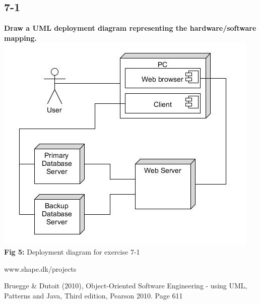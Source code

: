 \documentclass[12pt]{article}
\begin{document}
\newpage
\subsection{7-1}
\textbf{Draw a UML deployment diagram representing the hardware/software mapping.}\\

\includegraphics[scale=0.7]{7-1}\\
\textbf{Fig 5:} Deployment diagram for exercise 7-1










\newpage
\begin{thebibliography}{9}

  www.shape.dk/projects
  
Bruegge \& Dutoit (2010), Object-Oriented Software Engineering - using UML, Patterns and
Java, Third edition, Pearson 2010. Page 611 

\end{thebibliography}
\end{document}
